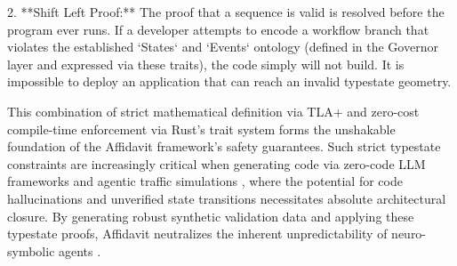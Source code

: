 2. **Shift Left Proof:** The proof that a sequence is valid is resolved before the program ever runs. If a developer attempts to encode a workflow branch that violates the established `States` and `Events` ontology (defined in the Governor layer and expressed via these traits), the code simply will not build. It is impossible to deploy an application that can reach an invalid typestate geometry.

This combination of strict mathematical definition via TLA+ and zero-cost compile-time enforcement via Rust's trait system forms the unshakable foundation of the Affidavit framework's safety guarantees. Such strict typestate constraints are increasingly critical when generating code via zero-code LLM frameworks \cite{ref_AutoAgentAFully57} and agentic traffic simulations \cite{ref_CARJANAgentBase64}, where the potential for code hallucinations \cite{ref_CodeHaluInvesti59} and unverified state transitions necessitates absolute architectural closure. By generating robust synthetic validation data \cite{ref_InParsSuperchar60} and applying these typestate proofs, Affidavit neutralizes the inherent unpredictability of neuro-symbolic agents \cite{ref_FastandAccurate62}.

